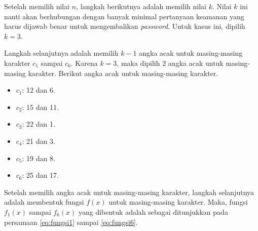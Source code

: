 Setelah memilih nilai \begin{math}n\end{math}, langkah berikutnya adalah memilih nilai \begin{math}k\end{math}. Nilai \begin{math}k\end{math} ini nanti akan berhubungan dengan banyak minimal pertanyaan keamanan yang harus dijawab benar untuk mengembalikan \textit{password}. Untuk kasus ini, dipilih \begin{math}k=3\end{math}.

Langkah selanjutnya adalah memilih \begin{math}k-1\end{math} angka acak untuk masing-masing karakter \begin{math}c_1\end{math} sampai \begin{math}c_6\end{math}. Karena \begin{math}k=3\end{math}, maka dipilih 2 angka acak untuk masing-masing karakter. Berikut angka acak untuk masing-masing karakter.

\begin{itemize}
	\item \begin{math}c_1\end{math}: 12 dan 6.
	\item \begin{math}c_2\end{math}: 15 dan 11.
	\item \begin{math}c_3\end{math}: 22 dan 1.
	\item \begin{math}c_4\end{math}: 21 dan 3.
	\item \begin{math}c_5\end{math}: 19 dan 8.
	\item \begin{math}c_6\end{math}: 25 dan 17.
\end{itemize}

Setelah memilih angka acak untuk masing-masing karakter, langkah selanjutnya adalah membentuk fungsi \begin{math}f(x)\end{math} untuk masing-masing karakter. Maka, fungsi \begin{math}f_1(x)\end{math} sampai \begin{math}f_6(x)\end{math} yang dibentuk adalah sebagai ditunjukkan pada persamaan \ref{eq:fungsi1} sampai \ref{eq:fungsi6}.

